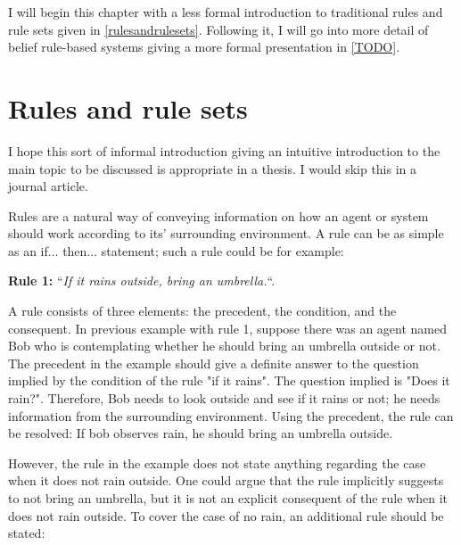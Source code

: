 I will begin this chapter with a less formal introduction to traditional rules and rule sets given in \ref{rulesandrulesets}.
Following it, I will go into more detail of belief rule-based systems giving a more formal presentation in \ref{TODO}.

\section{Rules and rule sets}

{\color{red}I hope this sort of informal introduction giving an intuitive introduction to the main topic to be discussed
is appropriate in a thesis. I would skip this in a journal article.}

\label{rulesandrulesets}
Rules are a natural way of conveying information on how an agent or system should work according to its' surrounding environment.
A rule can be as simple as an if... then... statement; such a rule could be for example:

\begin{displayquote}
\textbf{Rule 1:} ``\textit{If it rains outside, bring an umbrella.}``.
\end{displayquote}

A rule consists of three elements: the precedent, the condition, and the consequent. In previous example with rule 1,
suppose there was an agent named Bob who is contemplating whether he should bring an umbrella
outside or not. The precedent in the example should give a definite answer to the question implied by the condition of
the rule "if it rains". The question implied is "Does it rain?".
Therefore, Bob needs to look outside and see if it rains or not; he needs information from the surrounding environment.
Using the precedent, the rule can be resolved: If bob observes rain, he should bring an umbrella outside.

However, the rule in the example does not state anything
regarding the case when it does not rain outside. One could argue that the rule implicitly suggests to not bring an umbrella,
but it is not an explicit consequent of the rule when it does not rain outside. To cover the case of no rain, an additional rule should be stated:

